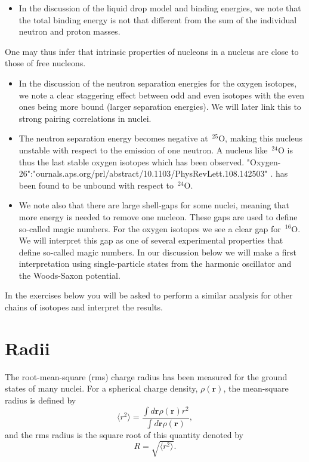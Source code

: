 \documentclass[%
oneside,                 %
final,                   %
10pt]{article}
\begin{document}
\begin{itemize}
\item In the discussion of the liquid drop model and binding energies, we note that the total binding energy is not that different from the sum of the individual neutron and proton masses. 
\end{itemize}

\noindent
One may thus infer that intrinsic properties of nucleons in a nucleus are close to those of free nucleons.
\begin{itemize}
\item In the discussion of the neutron separation energies for the oxygen isotopes, we note  a clear staggering effect between odd and even isotopes with the even ones being more bound (larger separation energies). We will later link this to strong pairing correlations in nuclei.

\item The neutron separation energy becomes negative at $\,{}^{25}\mbox{O}$, making this nucleus unstable with respect to the emission of one neutron. A nucleus like $\,{}^{24}\mbox{O}$ is thus the last stable oxygen isotopes which has been observed. "Oxygen-26":"ournals.aps.org/prl/abstract/10.1103/PhysRevLett.108.142503" . has been found to be unbound with respect to $\,{}^{24}\mbox{O}$.

\item We note also that there are large shell-gaps for some nuclei, meaning that more energy is needed to remove one nucleon. These gaps are used to define so-called magic numbers. For the oxygen isotopes we see a clear gap for $\,{}^{16}\mbox{O}$. We will interpret this gap as one of several experimental properties that define so-called magic numbers. In our discussion below we will make a first interpretation using  single-particle states from the harmonic oscillator and the Woods-Saxon potential. 
\end{itemize}

\noindent
In the exercises below you will be asked to perform a similar analysis for other chains of isotopes and interpret the results. 



\section*{Radii}

The root-mean-square (rms) charge radius has been measured for the ground states of many
nuclei. For a spherical charge density, $\rho(\bm{r})$, the mean-square radius is defined by
\[
\langle r^2\rangle = \frac{ \int  d \bm{r} \rho(\bm{r}) r^2}{ \int  d \bm{r} \rho(\bm{r})},
\]
and the rms radius is the square root of this quantity denoted by
\[
R =\sqrt{ \langle r^2\rangle}.
\]
\end{document}
